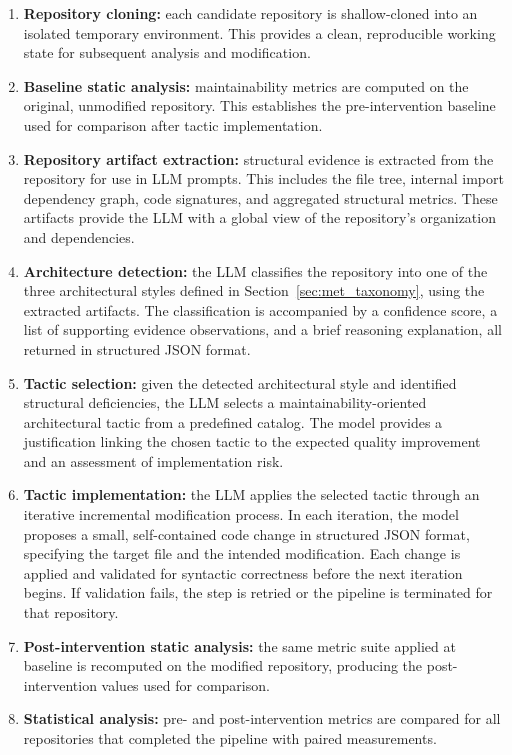 \begin{enumerate}
    \item \textbf{Repository cloning:} each candidate repository is shallow-cloned into an isolated temporary environment. This provides a clean, reproducible working state for subsequent analysis and modification.

    \item \textbf{Baseline static analysis:} maintainability metrics are computed on the original, unmodified repository. This establishes the pre-intervention baseline used for comparison after tactic implementation.

    \item \textbf{Repository artifact extraction:} structural evidence is extracted from the repository for use in LLM prompts. This includes the file tree, internal import dependency graph, code signatures, and aggregated structural metrics. These artifacts provide the LLM with a global view of the repository's organization and dependencies.

    \item \textbf{Architecture detection:} the LLM classifies the repository into one of the three architectural styles defined in Section~\ref{sec:met_taxonomy}, using the extracted artifacts. The classification is accompanied by a confidence score, a list of supporting evidence observations, and a brief reasoning explanation, all returned in structured JSON format.

    \item \textbf{Tactic selection:} given the detected architectural style and identified structural deficiencies, the LLM selects a maintainability-oriented architectural tactic from a predefined catalog. The model provides a justification linking the chosen tactic to the expected quality improvement and an assessment of implementation risk.

    \item \textbf{Tactic implementation:} the LLM applies the selected tactic through an iterative incremental modification process. In each iteration, the model proposes a small, self-contained code change in structured JSON format, specifying the target file and the intended modification. Each change is applied and validated for syntactic correctness before the next iteration begins. If validation fails, the step is retried or the pipeline is terminated for that repository.

    \item \textbf{Post-intervention static analysis:} the same metric suite applied at baseline is recomputed on the modified repository, producing the post-intervention values used for comparison.

    \item \textbf{Statistical analysis:} pre- and post-intervention metrics are compared for all repositories that completed the pipeline with paired measurements.
\end{enumerate}

